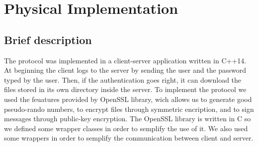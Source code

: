 \chapter{Physical Implementation}
\section{Brief description}
\par The protocol was implemented in a client-server application written in C++14. At beginning the client logs to the server by sending the user and the password typed by the user. Then, if the authentication goes right, it can download the files stored in its own directory inside the server. To implement the protocol we used the feuatures provided by OpenSSL library, wich allows us to generate good pseudo-rando numbers, to encrypt files through symmetric encription, and to sign messages through public-key encryption. The OpenSSL library is written in C so we defined some wrapper classes in order to semplify the use of it. We also used some wrappers in order to semplify the communication between client and server.